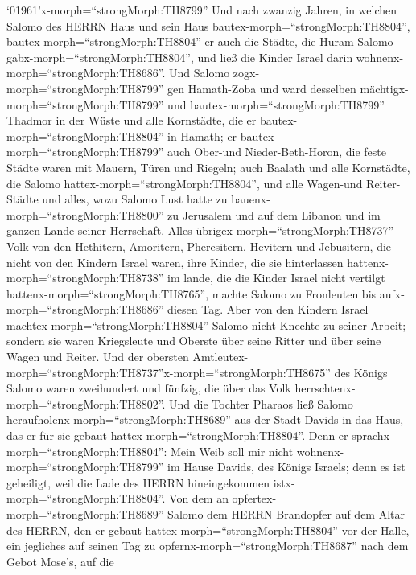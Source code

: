  `01961'\textbar x-morph=``strongMorph:TH8799'' Und nach
zwanzig Jahren, in welchen Salomo des HERRN Haus und sein Haus
bautex-morph=``strongMorph:TH8804'', 
bautex-morph=``strongMorph:TH8804'' er auch die Städte, die Huram Salomo
gabx-morph=``strongMorph:TH8804'', und ließ die Kinder Israel darin
wohnenx-morph=``strongMorph:TH8686''.  Und Salomo
zogx-morph=``strongMorph:TH8799'' gen Hamath-Zoba und ward desselben
mächtigx-morph=``strongMorph:TH8799''  und
bautex-morph=``strongMorph:TH8799'' Thadmor in der Wüste und alle
Kornstädte, die er bautex-morph=``strongMorph:TH8804'' in Hamath;
 er bautex-morph=``strongMorph:TH8799'' auch Ober-und
Nieder-Beth-Horon, die feste Städte waren mit Mauern, Türen und Riegeln;
 auch Baalath und alle Kornstädte, die Salomo
hattex-morph=``strongMorph:TH8804'', und alle Wagen-und Reiter-Städte
und alles, wozu Salomo Lust hatte zu bauenx-morph=``strongMorph:TH8800''
zu Jerusalem und auf dem Libanon und im ganzen Lande seiner Herrschaft.
 Alles übrigex-morph=``strongMorph:TH8737'' Volk von den
Hethitern, Amoritern, Pheresitern, Hevitern und Jebusitern, die nicht
von den Kindern Israel waren,  ihre Kinder, die sie
hinterlassen hattenx-morph=``strongMorph:TH8738'' im lande, die die
Kinder Israel nicht vertilgt hattenx-morph=``strongMorph:TH8765'',
machte Salomo zu Fronleuten bis aufx-morph=``strongMorph:TH8686'' diesen
Tag.  Aber von den Kindern Israel
machtex-morph=``strongMorph:TH8804'' Salomo nicht Knechte zu seiner
Arbeit; sondern sie waren Kriegsleute und Oberste über seine Ritter und
über seine Wagen und Reiter.  Und der obersten
Amtleutex-morph=``strongMorph:TH8737''\textbar x-morph=``strongMorph:TH8675''
des Königs Salomo waren zweihundert und fünfzig, die über das Volk
herrschtenx-morph=``strongMorph:TH8802''.  Und die Tochter
Pharaos ließ Salomo heraufholenx-morph=``strongMorph:TH8689'' aus der
Stadt Davids in das Haus, das er für sie gebaut
hattex-morph=``strongMorph:TH8804''. Denn er
sprachx-morph=``strongMorph:TH8804'': Mein Weib soll mir nicht
wohnenx-morph=``strongMorph:TH8799'' im Hause Davids, des Königs
Israels; denn es ist geheiligt, weil die Lade des HERRN hineingekommen
istx-morph=``strongMorph:TH8804''.  Von dem an
opfertex-morph=``strongMorph:TH8689'' Salomo dem HERRN Brandopfer auf
dem Altar des HERRN, den er gebaut hattex-morph=``strongMorph:TH8804''
vor der Halle,  ein jegliches auf seinen Tag zu
opfernx-morph=``strongMorph:TH8687'' nach dem Gebot Mose's, auf die
